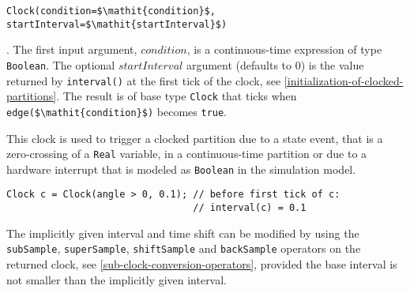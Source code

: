\begin{operatordefinition*}[Clock]\label{modelica:clock-event}
\begin{synopsis}\begin{lstlisting}
Clock(condition=$\mathit{condition}$, startInterval=$\mathit{startInterval}$)
\end{lstlisting}\end{synopsis}
\begin{semantics}
.
The first input argument, $\mathit{condition}$, is a continuous-time expression of type \lstinline!Boolean!.
The optional $\mathit{startInterval}$ argument (defaults to 0) is the value returned by \lstinline!interval()! at the first tick of the clock, see \cref{initialization-of-clocked-partitions}.
The result is of base type \lstinline!Clock! that ticks when \lstinline!edge($\mathit{condition}$)! becomes \lstinline!true!.
\begin{nonnormative}
This clock is used to trigger a clocked partition due to a state event, that is a zero-crossing of a \lstinline!Real! variable, in a continuous-time partition or due to a hardware interrupt that is modeled as \lstinline!Boolean! in the simulation model.
\end{nonnormative}

\begin{example}
\begin{lstlisting}[language=modelica]
Clock c = Clock(angle > 0, 0.1); // before first tick of c:
                                 // interval(c) = 0.1
\end{lstlisting}
\end{example}

\begin{nonnormative}
The implicitly given interval and time shift can be modified by using the \lstinline!subSample!, \lstinline!superSample!, \lstinline!shiftSample! and \lstinline!backSample! operators on the returned clock, see \cref{sub-clock-conversion-operators}, provided the base interval is not smaller than the implicitly given interval.
\end{nonnormative}
\end{semantics}
\end{operatordefinition*}

